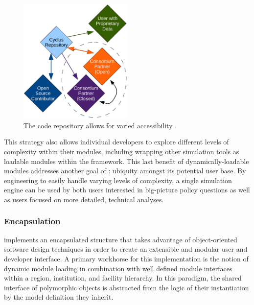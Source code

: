 \begin{figure}[htb!]
  \begin{center}
    \includegraphics[width=0.5\textwidth]{./chapters/paradigm/openness.eps}
  \end{center}
  \caption[Schematic of the \Cyclus code repository.]{The \Cyclus code repository allows for varied accessibility 
  \cite{wilson_cyclus:_2012}.}
  \label{fig:repo}
\end{figure}

This strategy also allows individual developers to
explore different levels of complexity within their modules, including
wrapping other simulation tools as loadable modules within the \Cyclus 
framework. This last benefit of dynamically-loadable modules addresses 
another goal of \Cyclus: ubiquity amongst its potential user base. By
engineering \Cyclus to easily handle varying levels of complexity, a single
simulation engine can be used by both users interested in big-picture policy
questions as well as users focused on more detailed, technical
analyses.

\subsubsection{Encapsulation}

\Cyclus implements an encapsulated structure that takes advantage of 
object-oriented software design techniques in order to create an 
extensible and modular user and developer interface. A primary 
workhorse for this implementation is the notion of dynamic module 
loading in combination with  well defined module interfaces within 
a region, institution, and facility  hierarchy. In this paradigm, 
the shared interface of polymorphic objects is abstracted from the 
logic of their instantiation by the model definition they inherit.  

